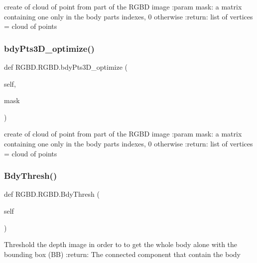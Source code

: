 \begin{DoxyVerb}create of cloud of point from part of the RGBD image
:param mask: a matrix containing one only in the body parts indexes, 0 otherwise
:return:  list of vertices = cloud of points
\end{DoxyVerb}
 \mbox{\label{class_r_g_b_d_1_1_r_g_b_d_a7565e3c0d9929b23e94ce900df4af67a}} 
\subsubsection{bdy\+Pts3\+D\+\_\+optimize()}
{\footnotesize\ttfamily def R\+G\+B\+D.\+R\+G\+B\+D.\+bdy\+Pts3\+D\+\_\+optimize (\begin{DoxyParamCaption}\item[{}]{self,  }\item[{}]{mask }\end{DoxyParamCaption})}

\begin{DoxyVerb}create of cloud of point from part of the RGBD image
:param mask: a matrix containing one only in the body parts indexes, 0 otherwise
:return:  list of vertices = cloud of points
\end{DoxyVerb}
 \mbox{\label{class_r_g_b_d_1_1_r_g_b_d_ad9c546e3a447805ff908cbc072efe6e5}} 
\subsubsection{Bdy\+Thresh()}
{\footnotesize\ttfamily def R\+G\+B\+D.\+R\+G\+B\+D.\+Bdy\+Thresh (\begin{DoxyParamCaption}\item[{}]{self }\end{DoxyParamCaption})}

\begin{DoxyVerb}Threshold the depth image in order to to get the whole body alone with the bounding box (BB)
:return: The connected component that contain the body
\end{DoxyVerb}
 \mbox{\label{class_r_g_b_d_1_1_r_g_b_d_a8009d6498ed9607e5fb86d8085244d4f}} 
